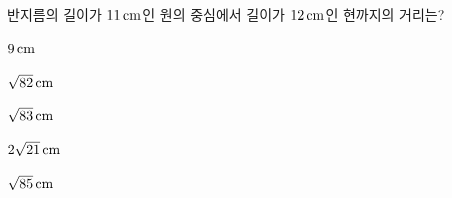 반지름의 길이가 $11\mkern3mu \mathrm{cm}$인 원의 중심에서 길이가 $12\mkern3mu \mathrm{cm}$인 현까지의 거리는?
\begin{choices32}{\rule[-3ex]{0pt}{8ex}$9\mkern3mu \mathrm{cm}$}{\rule[-3ex]{0pt}{8ex}$\sqrt{82}\mkern3mu \mathrm{cm}$}{\rule[-3ex]{0pt}{8ex}$\sqrt{83}\mkern3mu \mathrm{cm}$}{\rule[-3ex]{0pt}{8ex}$2\sqrt{21}\mkern3mu \mathrm{cm}$}{\rule[-3ex]{0pt}{8ex}$\sqrt{85}\mkern3mu \mathrm{cm}$}\end{choices32}
